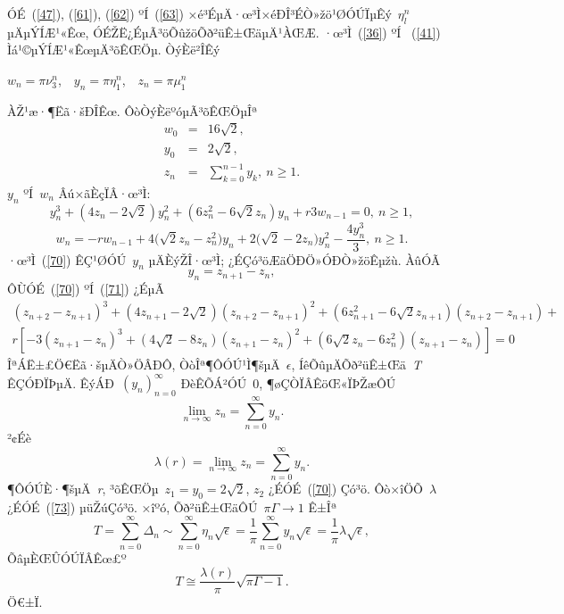 \documentclass[12pt,openany,CJK,oneside]{cctbook}
\begin{document}
{ÓÉ\ (\ref{47}), (\ref{61}), (\ref{62}) ºÍ\ (\ref{63}) ×é³ÉµÄ·œ³Ì×éÐÎ³ÉÒ»žö¹ØÓÚÏµÊý\ $\eta_{l}^{n}$ µÄµÝÍÆ¹«Êœ, ÓÉŽË¿ÉµÃ³öÕûžöÕð²üÊ±ŒäµÄ¹ÀŒÆ. ·œ³Ì\ (\ref{36}) ºÍ \ (\ref{41}) Ìá¹©µÝÍÆ¹«ÊœµÄ³õÊŒÖµ. ÒýÈë²ÎÊý
\begin{center}
 $w_{n}=\pi\nu_{3}^{n}$,\ \ $y_{n}=\pi \eta_{1}^{n}$,\ \ $z_{n}=\pi\mu_{1}^{n}$
\end{center}
ÀŽ¹æ·¶Ëã·šÐÎÊœ. ÔòÒýÈëºóµÃ³õÊŒÖµÎª
\begin{eqnarray}
  w_{0} &=& 16\sqrt{2}, \\
  y_{0} &=& 2\sqrt{2}, \\
  z_{n} &=& \sum_{k=0}^{n-1}y_{k},\ n\geq1.
 \end{eqnarray}
 $y_n$ ºÍ\ $w_n$ Âú×ãÈçÏÂ·œ³Ì:
\begin{equation}\label{70}
  y_{n}^{3}+(4z_{n}-2\sqrt{2})y_{n}^{2}+(6z_{n}^{2}-6\sqrt{2}z_{n})y_{n}+r3w_{n-1}=0,\ n\geq1,
\end{equation}
\begin{equation}\label{71}
  w_{n}= -rw_{n-1}+4\Big(\sqrt{2}z_{n}-z_{n}^{2}\Big)y_{n}+2\Big(\sqrt{2}-2z_{n}\Big)y_{n}^{2}-\frac{4y_{n}^{3}}{3},\ n\geq1.
\end{equation}
·œ³Ì\ (\ref{70}) ÊÇ¹ØÓÚ\ $y_{n}$ µÄÈýŽÎ·œ³Ì; ¿ÉÇó³öÆäÖÐÖ»ÓÐÒ»žöÊµžù.
ÀûÓÃ\begin{equation}\label{72}
  y_n=z_{n+1}-z_{n},
\end{equation}
ÔÙÓÉ\ (\ref{70}) ºÍ\ (\ref{71}) ¿ÉµÃ
\begin{multline}\label{73}
  (z_{n+2}-z_{n+1})^{3}+(4z_{n+1}-2\sqrt{2})(z_{n+2}-z_{n+1})^{2}+(6z_{n+1}^{2}-6\sqrt{2}z_{n+1})(z_{n+2}-z_{n+1})+ \\
  r[-3(z_{n+1}-z_{n})^3+(4\sqrt{2}-8z_n)(z_{n+1}-z_{n})^2+(6\sqrt{2}z_n-6z_n^2)(z_{n+1}-z_{n})]=0
\end{multline}
ÎªÁË±£Ö€Ëã·šµÄÒ»ÖÂÐÔ, ÒòÎª¶ÔÓÚ¹Ì¶šµÄ\ $\epsilon$, ÍêÕûµÄÕð²üÊ±Œä\ \emph{T} ÊÇÓÐÏÞµÄ. ÊýÁÐ\ $(y_{n})_{n=0}^{\infty}$ ÐèÊÕÁ²ÓÚ\ 0, ¶øÇÒÏÂÊöŒ«ÏÞŽæÔÚ
\begin{equation}\label{74}
  \lim_{n\rightarrow\infty}z_{n}=\sum_{n=0}^{\infty}y_{n}.
\end{equation}
²¢Éè
\begin{equation}\label{75}
  \lambda(r)=\lim_{n\rightarrow\infty}z_{n}=\sum_{n=0}^{\infty}y_{n}.
\end{equation}
¶ÔÓÚÈ·¶šµÄ\ \emph{r}, ³õÊŒÖµ\ $z_1=y_0=2\sqrt{2}$, $z_2$ ¿ÉÓÉ\ (\ref{70}) Çó³ö. Ôò×îÖÕ\ $\lambda$ ¿ÉÓÉ\ (\ref{73}) µüŽúÇó³ö. ×îºó, Õð²üÊ±ŒäÔÚ\ $\pi\Gamma\rightarrow 1$ Ê±Îª
\begin{equation}\label{f1}
  T=\sum_{n=0}^{\infty}\Delta_{n}\sim\sum_{n=0}^{\infty}\eta_{n}\sqrt{\epsilon}=\frac{1}{\pi}\sum_{n=0}^{\infty}y_{n}\sqrt{\epsilon}=\frac{1}{\pi}\lambda\sqrt{\epsilon},
\end{equation}
ÕâµÈŒÛÓÚÏÂÊœ£º
\begin{equation}\label{Final}
  T\cong\frac{\lambda(r)}{\pi}\sqrt{\pi\Gamma-1}.
\end{equation}
Ö€±Ï.

}
\end{document}

